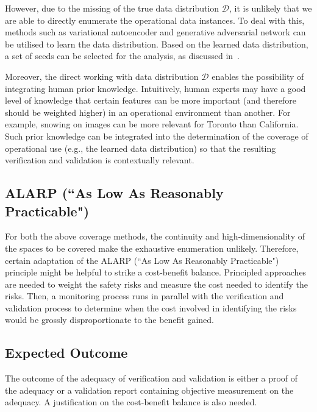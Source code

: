 However, due to the missing of the true data distribution $\mathcal{D}$, it is unlikely that we are able to directly enumerate the operational data instances. To deal with this, methods such as variational autoencoder and generative adversarial network can be utilised to learn the data distribution. Based on the learned data distribution, a set of seeds can be selected for the analysis, as discussed in~\cite{DBLP:journals/corr/abs-2112-00646}. 

Moreover, the direct working with data distribution  $\mathcal{D}$ enables the possibility of integrating human prior knowledge. Intuitively, human experts may have a good level of knowledge that certain features can be more important (and therefore should be weighted higher) in an operational environment than another. For example, snowing on images can be more relevant for Toronto than California. Such prior knowledge can be integrated into the determination of the coverage of operational use (e.g., the learned data distribution) so that the resulting verification and validation is contextually relevant. 

\subsection*{ALARP (``As Low As Reasonably Practicable")}

For both the above coverage methods, the continuity and high-dimensionality of the spaces to be covered make the exhaustive enumeration unlikely. Therefore, certain adaptation of the ALARP (``As Low As Reasonably Practicable") principle might be helpful to strike a cost-benefit balance. Principled approaches are needed to weight the safety risks and measure the cost needed to identify the risks. Then, a monitoring process runs in parallel with the verification and validation process to determine when the cost involved in identifying the risks would be grossly disproportionate to the benefit gained. 


\subsection*{Expected Outcome} 

The outcome of the adequacy of verification and validation is either a proof of the adequacy or a validation report containing objective measurement on the adequacy. A justification on the cost-benefit balance is also needed. 